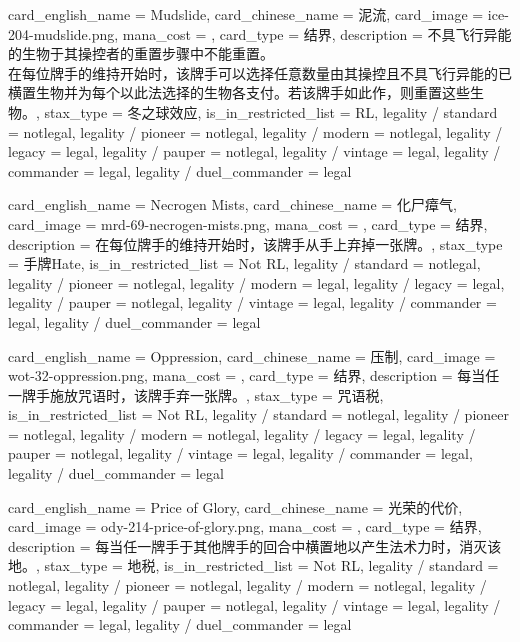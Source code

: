 \documentclass[lang = cn, color = black, 10pt]{AllThatStax}
\begin{document}
\card
{
	card_english_name = {Mudslide},
	card_chinese_name = {泥流},
	card_image = ice-204-mudslide.png,
	mana_cost = ,
	card_type = 结界,
	description = {不具飞行异能的生物于其操控者的重置步骤中不能重置。\\
在每位牌手的维持开始时，该牌手可以选择任意数量由其操控且不具飞行异能的已横置生物并为每个以此法选择的生物各支付。若该牌手如此作，则重置这些生物。},
	stax_type = 冬之球效应,
	is_in_restricted_list = RL,
	legality / standard = notlegal,
	legality / pioneer = notlegal,
	legality / modern = notlegal,
	legality / legacy = legal,
	legality / pauper = notlegal,
	legality / vintage = legal,
	legality / commander = legal,
	legality / duel_commander = legal
}

\card
{
	card_english_name = {Necrogen Mists},
	card_chinese_name = {化尸瘴气},
	card_image = mrd-69-necrogen-mists.png,
	mana_cost = ,
	card_type = 结界,
	description = {在每位牌手的维持开始时，该牌手从手上弃掉一张牌。},
	stax_type = 手牌Hate,
	is_in_restricted_list = Not RL,
	legality / standard = notlegal,
	legality / pioneer = notlegal,
	legality / modern = legal,
	legality / legacy = legal,
	legality / pauper = notlegal,
	legality / vintage = legal,
	legality / commander = legal,
	legality / duel_commander = legal
}

\card
{
	card_english_name = {Oppression},
	card_chinese_name = {压制},
	card_image = wot-32-oppression.png,
	mana_cost = ,
	card_type = 结界,
	description = {每当任一牌手施放咒语时，该牌手弃一张牌。},
	stax_type = 咒语税,
	is_in_restricted_list = Not RL,
	legality / standard = notlegal,
	legality / pioneer = notlegal,
	legality / modern = notlegal,
	legality / legacy = legal,
	legality / pauper = notlegal,
	legality / vintage = legal,
	legality / commander = legal,
	legality / duel_commander = legal
}

\card
{
	card_english_name = {Price of Glory},
	card_chinese_name = {光荣的代价},
	card_image = ody-214-price-of-glory.png,
	mana_cost = ,
	card_type = 结界,
	description = {每当任一牌手于其他牌手的回合中横置地以产生法术力时，消灭该地。},
	stax_type = 地税,
	is_in_restricted_list = Not RL,
	legality / standard = notlegal,
	legality / pioneer = notlegal,
	legality / modern = notlegal,
	legality / legacy = legal,
	legality / pauper = notlegal,
	legality / vintage = legal,
	legality / commander = legal,
	legality / duel_commander = legal
}
\end{document}
